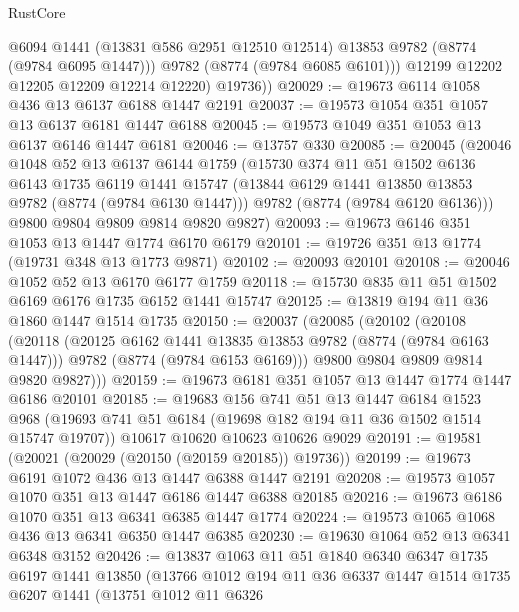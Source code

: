 \begin{lexlean}{RustCore}
\begin{coremodule}
              @6094
              @1441
              (@13831 @586 @2951 @12510 @12514)
              @13853
              @9782
              (@8774 (@9784 @6095 @1447)))
            @9782
            (@8774 (@9784 @6085 @6101)))
          @12199
          @12202
          @12205
          @12209
          @12214
          @12220)
        @19736))
@20029 := @19673 @6114 @1058 @436 @13 @6137 @6188 @1447 @2191
@20037 := @19573 @1054 @351 @1057 @13 @6137 @6181 @1447 @6188
@20045 := @19573 @1049 @351 @1053 @13 @6137 @6146 @1447 @6181
@20046 := @13757 @330
@20085 := @20045
    (@20046
      @1048
      @52
      @13
      @6137
      @6144
      @1759
      (@15730
        @374
        @11
        @51
        @1502
        @6136
        @6143
        @1735
        @6119
        @1441
        @15747
        (@13844 @6129 @1441 @13850 @13853 @9782 (@8774 (@9784 @6130 @1447)))
        @9782
        (@8774 (@9784 @6120 @6136)))
      @9800
      @9804
      @9809
      @9814
      @9820
      @9827)
@20093 := @19673 @6146 @351 @1053 @13 @1447 @1774 @6170 @6179
@20101 := @19726 @351 @13 @1774 (@19731 @348 @13 @1773 @9871)
@20102 := @20093 @20101
@20108 := @20046 @1052 @52 @13 @6170 @6177 @1759
@20118 := @15730 @835 @11 @51 @1502 @6169 @6176 @1735 @6152 @1441 @15747
@20125 := @13819 @194 @11 @36 @1860 @1447 @1514 @1735
@20150 := @20037
    (@20085
      (@20102
        (@20108
          (@20118
            (@20125 @6162 @1441 @13835 @13853 @9782 (@8774 (@9784 @6163 @1447)))
            @9782
            (@8774 (@9784 @6153 @6169)))
          @9800
          @9804
          @9809
          @9814
          @9820
          @9827)))
@20159 := @19673 @6181 @351 @1057 @13 @1447 @1774 @1447 @6186 @20101
@20185 := @19683
    @156
    @741
    @51
    @13
    @1447
    @6184
    @1523
    @968
    (@19693 @741 @51 @6184 (@19698 @182 @194 @11 @36 @1502 @1514 @15747 @19707))
    @10617
    @10620
    @10623
    @10626
    @9029
@20191 := @19581 (@20021 (@20029 (@20150 (@20159 @20185)) @19736))
@20199 := @19673 @6191 @1072 @436 @13 @1447 @6388 @1447 @2191
@20208 := @19573 @1057 @1070 @351 @13 @1447 @6186 @1447 @6388 @20185
@20216 := @19673 @6186 @1070 @351 @13 @6341 @6385 @1447 @1774
@20224 := @19573 @1065 @1068 @436 @13 @6341 @6350 @1447 @6385
@20230 := @19630 @1064 @52 @13 @6341 @6348 @3152
@20426 := @13837
    @1063
    @11
    @51
    @1840
    @6340
    @6347
    @1735
    @6197
    @1441
    @13850
    (@13766
      @1012
      @194
      @11
      @36
      @6337
      @1447
      @1514
      @1735
      @6207
      @1441
      (@13751
        @1012
        @11
        @6326

\end{coremodule}
\end{lexlean}

